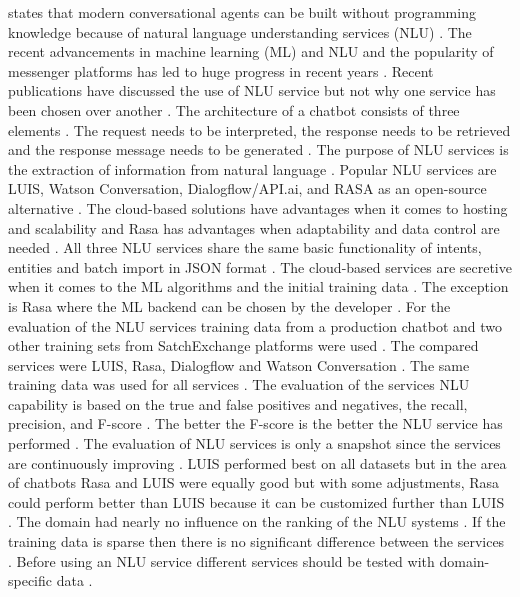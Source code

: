 \citet{braunEvaluatingNLU} states that modern conversational agents can be built without programming 
knowledge because of natural language understanding services (NLU) \cite{braunEvaluatingNLU}. 
The recent advancements in machine learning (ML) and NLU and the popularity of messenger platforms 
has led to huge progress in recent years \cite{braunEvaluatingNLU}. Recent publications have discussed 
the use of NLU service but not why one service has been chosen over another \cite{braunEvaluatingNLU}. 
The architecture of a chatbot consists of three elements \cite{braunEvaluatingNLU}. 
The request needs to be interpreted, the response needs to be retrieved and the response message
needs to be generated \cite{braunEvaluatingNLU}. 
The purpose of NLU services is the extraction of information from natural language \cite{braunEvaluatingNLU}. 
Popular NLU services are LUIS, Watson Conversation, Dialogflow/API.ai, and RASA as an open-source alternative \cite{braunEvaluatingNLU}. 
The cloud-based solutions have advantages when it comes to hosting and scalability and Rasa has advantages
when adaptability and data control are needed \cite{braunEvaluatingNLU}. 
All three NLU services share the same basic functionality of intents, entities and batch import in JSON format \cite{braunEvaluatingNLU}.
The cloud-based services are secretive when it comes to the ML algorithms and the initial training data \cite{braunEvaluatingNLU}. 
The exception is Rasa where the ML backend can be chosen by the developer \cite{braunEvaluatingNLU}. 
For the evaluation of the NLU services training data from a production chatbot and two other training sets from SatchExchange
platforms were used \cite{braunEvaluatingNLU}. 
The compared services were LUIS, Rasa, Dialogflow and Watson Conversation \cite{braunEvaluatingNLU}. 
The same training data was used for all services \cite{braunEvaluatingNLU}. 
The evaluation of the services NLU capability is based on the true and false positives and negatives, 
the recall, precision, and F-score \cite{braunEvaluatingNLU}. 
The better the F-score is the better the NLU service has performed \cite{braunEvaluatingNLU}. 
The evaluation of NLU services is only a snapshot since the services are continuously improving \cite{braunEvaluatingNLU}. 
LUIS performed best on all datasets but in the area of chatbots Rasa and LUIS were equally good but 
with some adjustments, Rasa could perform better than LUIS because it can be customized further than LUIS \cite{braunEvaluatingNLU}. 
The domain had nearly no influence on the ranking of the NLU systems \cite{braunEvaluatingNLU}.
If the training data is sparse then there is no significant difference between the services \cite{braunEvaluatingNLU}. 
Before using an NLU service different services should be tested with domain-specific data \cite{braunEvaluatingNLU}.

